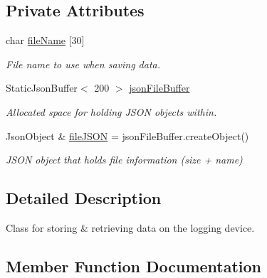 \subsection*{Private Attributes}
\begin{DoxyCompactItemize}
\item 
\mbox{\label{class_logging_device_1_1_storage_ac1054cb167ed5818aea16229ac713da8}} 
char \hyperlink{class_logging_device_1_1_storage_ac1054cb167ed5818aea16229ac713da8}{file\+Name} \mbox{[}30\mbox{]}
\begin{DoxyCompactList}\small\item\em File name to use when saving data. \end{DoxyCompactList}\item 
\mbox{\label{class_logging_device_1_1_storage_aac1f0bd8bdef03ee34da1ec9eb9a5df8}} 
Static\+Json\+Buffer$<$ 200 $>$ \hyperlink{class_logging_device_1_1_storage_aac1f0bd8bdef03ee34da1ec9eb9a5df8}{json\+File\+Buffer}
\begin{DoxyCompactList}\small\item\em Allocated space for holding J\+S\+ON objects within. \end{DoxyCompactList}\item 
\mbox{\label{class_logging_device_1_1_storage_a7427821696719fcd52623ff1ea178eb5}} 
Json\+Object \& \hyperlink{class_logging_device_1_1_storage_a7427821696719fcd52623ff1ea178eb5}{file\+J\+S\+ON} = json\+File\+Buffer.\+create\+Object()
\begin{DoxyCompactList}\small\item\em J\+S\+ON object that holds file information (size + name) \end{DoxyCompactList}\end{DoxyCompactItemize}


\subsection{Detailed Description}
Class for storing \& retrieving data on the logging device. 

\subsection{Member Function Documentation}
\mbox{\label{class_logging_device_1_1_storage_a98b01eb20a64a4bf4127685147f7f6f1}} 
